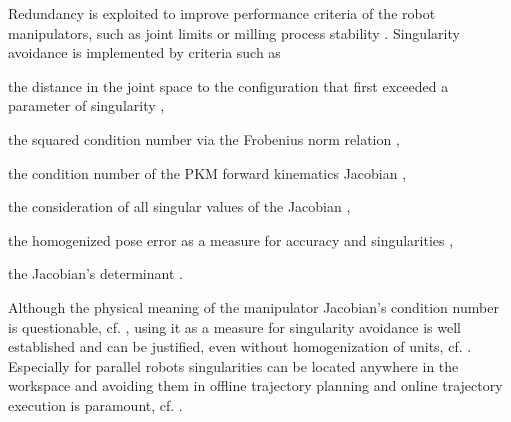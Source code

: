 \documentclass[a4paper,twoside]{article}
\begin{document}
Redundancy is exploited to improve performance criteria of the robot manipulators, such as joint limits \cite{HuoBar2008,ZhuQuCaoYan2013} or milling process stability \cite{MousaviGagBouRay2018}.
Singularity avoidance is implemented by criteria such as 
\begin{compactitem}
\item the distance in the joint space to the configuration that first exceeded a parameter of singularity \cite{HuoBar2008},
\item the squared condition number \cite{ZhuQuCaoYan2013,LegerAng2016,CorinaldiAngCal2016} via the Frobenius norm relation \cite{Merlet2006a},
\item the condition number of the PKM forward kinematics Jacobian \cite{GosselinSch2016}, %
\item the consideration of all singular values of the Jacobian \cite{SantosSil2017},
\item the homogenized pose error as a measure for accuracy and singularities \cite{KotlarskiDoHeiOrt2010},
\item the Jacobian's determinant \cite{AgarwalNasBan2016}.
\end{compactitem}

Although the physical meaning of the manipulator Jacobian's condition number is questionable, cf. \cite{KotlarskiDoHeiOrt2010}, using it as a measure for singularity avoidance is well established and can be justified, even without homogenization of units, cf. \cite{Merlet2006a}.
Especially for parallel robots singularities %
can be located anywhere in the workspace and avoiding them in offline trajectory planning and online trajectory execution is paramount, cf. \cite{LucesMilBen2017,GosselinSch2018}.
\end{document}
